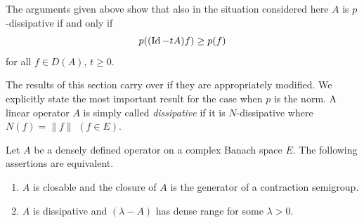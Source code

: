 The arguments given above show that also in the situation considered here $A$ is $p$-dissipative if and only if
\[
    p((\Id-tA)f) \geq p(f)
\]
for all $f \in D(A)$, $t \geq 0$.

The results of this section carry over if they are appropriately modified.
We explicitly state the most important result for the case when $p$ is the norm.
A linear operator $A$ is simply called \emph{dissipative} if it is $N$-dissipative where $N(f) = \|f\|$ $(f \in E)$.

\begin{theorem}\label{thm:a2-2.13}
Let $A$ be a densely defined operator on a complex Banach space $E$.
The following assertions are equivalent.
\begin{enumerate}[\upshape (a)]	
\item \label{thm:a2-2.13.1}
$A$ is closable and the closure of\/ $A$ is the generator of a contraction semigroup.
\item \label{thm:a2-2.13.2}
$A$ is dissipative and $(\lambda - A)$ has dense range for some $\lambda > 0$.
\end{enumerate}
\end{theorem}
